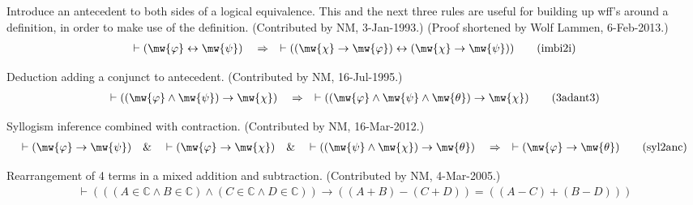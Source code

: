 \begin{lemma} Introduce an antecedent to both sides of a
logical equivalence.  This
       and the next three rules are useful for building up wff's around a
       definition, in order to make use of the definition.  (Contributed by
NM,
       3-Jan-1993.)  (Proof shortened by Wolf Lammen, 6-Feb-2013.)
\begin{align}
\vdash ( \mw{\varphi} \leftrightarrow \mw{\psi} )\quad\Rightarrow\quad \vdash (
    ( \mw{\chi} \rightarrow \mw{\varphi} ) \leftrightarrow ( \mw{\chi}
    \rightarrow \mw{\psi} ) )\label{eq:imbi2i}\tag{imbi2i}
\end{align}
\end{lemma}


\begin{lemma} Deduction adding a conjunct to antecedent. 
(Contributed by NM,
       16-Jul-1995.)
\begin{align}
\vdash ( ( \mw{\varphi} \wedge \mw{\psi} ) \rightarrow \mw{\chi}
    )\quad\Rightarrow\quad \vdash ( ( \mw{\varphi} \wedge \mw{\psi} \wedge
    \mw{\theta} ) \rightarrow \mw{\chi} )\label{eq:3adant3}\tag{3adant3}
\end{align}
\end{lemma}


\begin{lemma} Syllogism inference combined with
contraction.  (Contributed by NM,
       16-Mar-2012.)
\begin{align}
\vdash ( \mw{\varphi} \rightarrow \mw{\psi} )\quad\&\quad \vdash ( \mw{\varphi}
    \rightarrow \mw{\chi} )\quad\&\quad \vdash ( ( \mw{\psi} \wedge \mw{\chi} )
    \rightarrow \mw{\theta} )\quad\Rightarrow\quad \vdash ( \mw{\varphi}
    \rightarrow \mw{\theta} )\label{eq:syl2anc}\tag{syl2anc}
\end{align}
\end{lemma}


\begin{lemma} Rearrangement of 4 terms in a mixed
addition and subtraction.
     (Contributed by NM, 4-Mar-2005.)
\begin{align}
\vdash ( ( ( A \in \mathbb{C} \wedge B \in \mathbb{C} ) \wedge ( C \in
    \mathbb{C} \wedge D \in \mathbb{C} ) ) \rightarrow ( ( A + B ) \minus ( C +
    D ) ) = ( ( A \minus C ) + ( B \minus D ) )
    )\label{eq:addsub4}\tag{addsub4}
\end{align}
\end{lemma}


